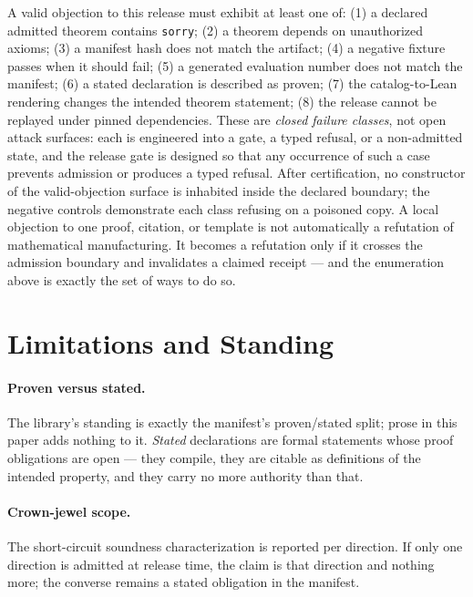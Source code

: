 \documentclass[11pt]{article}
\newif\ifreleasebuild
\begin{document}
A valid objection to this release must exhibit at least one of:
(1) a declared admitted theorem contains \texttt{sorry};
(2) a theorem depends on unauthorized axioms;
(3) a manifest hash does not match the artifact;
(4) a negative fixture passes when it should fail;
(5) a generated evaluation number does not match the manifest;
(6) a stated declaration is described as proven;
(7) the catalog-to-Lean rendering changes the intended theorem statement;
(8) the release cannot be replayed under pinned dependencies.
These are \emph{closed failure classes}, not open attack surfaces: each
is engineered into a gate, a typed refusal, or a non-admitted state, and
the release gate is designed so that any occurrence of such a case
prevents admission or produces a typed refusal. After certification, no
constructor of the valid-objection surface is inhabited inside the
declared boundary; the negative controls demonstrate each class refusing
on a poisoned copy. A local objection to one proof, citation, or template
is not automatically a refutation of mathematical manufacturing. It
becomes a refutation only if it crosses the admission boundary and
invalidates a claimed receipt --- and the enumeration above is exactly
the set of ways to do so.

\section{Limitations and Standing}
\label{sec:limitations}

\paragraph{Proven versus stated.}
The library's standing is exactly the manifest's proven/stated split; prose
in this paper adds nothing to it. \emph{Stated} declarations are formal
statements whose proof obligations are open --- they compile, they are
citable as definitions of the intended property, and they carry no more
authority than that.

\paragraph{Crown-jewel scope.}
The short-circuit soundness characterization is reported per direction. If
only one direction is admitted at release time, the claim is that direction
and nothing more; the converse remains a stated obligation in the manifest.
\ifreleasebuild
  
\else
\fi
\end{document}
